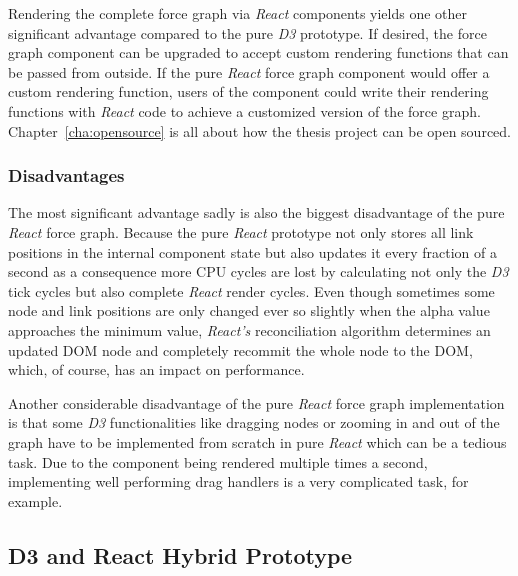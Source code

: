 Rendering the complete force graph via \emph{React} components yields one other significant advantage compared to the pure \emph{D3} prototype. If desired, the force graph component can be upgraded to accept custom rendering functions that can be passed from outside. If the pure \emph{React} force graph component would offer a custom rendering function, users of the component could write their rendering functions with \emph{React} code to achieve a customized version of the force graph. Chapter~\ref{cha:opensource} is all about how the thesis project can be open sourced.

\subsubsection{Disadvantages}

The most significant advantage sadly is also the biggest disadvantage of the pure \emph{React} force graph. Because the pure \emph{React} prototype not only stores all link positions in the internal component state but also updates it every fraction of a second as a consequence more CPU cycles are lost by calculating not only the \emph{D3} tick cycles but also complete \emph{React} render cycles. Even though sometimes some node and link positions are only changed ever so slightly when the alpha value approaches the minimum value, \emph{React's} reconciliation algorithm determines an updated DOM node and completely recommit the whole node to the DOM, which, of course, has an impact on performance.

Another considerable disadvantage of the pure \emph{React} force graph implementation is that some \emph{D3} functionalities like dragging nodes or zooming in and out of the graph have to be implemented from scratch in pure \emph{React} which can be a tedious task. Due to the component being rendered multiple times a second, implementing well performing drag handlers is a very complicated task, for example.


\subsection{D3 and React Hybrid Prototype}
\label{sub:D3AndReactHybrid}

